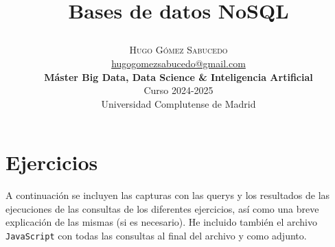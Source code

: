 \documentclass[a4paper,onecolumn]{article}
\title{\begin{center} \Huge Bases de datos NoSQL \end{center}} %
\author{
    \textsc{\Huge Hugo Gómez Sabucedo} \\ %
    \large \href{mailto:hugogomezsabucedo@gmail.com}{hugogomezsabucedo@gmail.com} \\ [2ex] %
    \Large \textbf{Máster Big Data, Data Science \& Inteligencia Artificial} \\
    \normalsize Curso 2024-2025 \\
    \large Universidad Complutense de Madrid
}
\date{} %
\let\stdsection\section
\renewcommand\section{\newpage\stdsection}
\begin{document}
\maketitle
\begin{sloppypar}


\section{Ejercicios} \label{ejericios}
A continuación se incluyen las capturas con las querys y los resultados de las ejecuciones de las consultas de los diferentes ejercicios, así como una breve 
explicación de las mismas (si es necesario). He incluido también el archivo \texttt{JavaScript} con todas las consultas al final del archivo y como adjunto.


\end{sloppypar}
\end{document}
